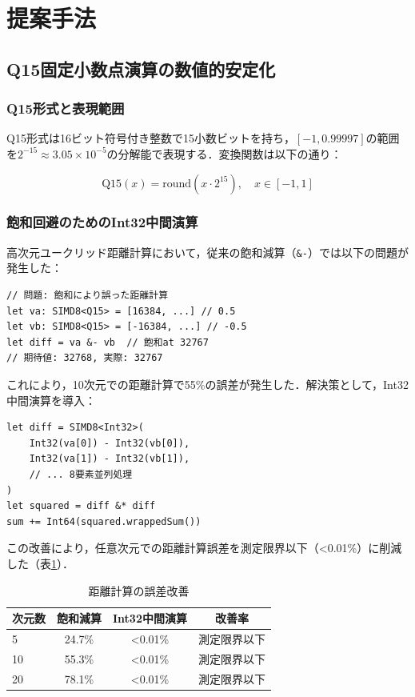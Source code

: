 \documentclass[paper]{ieice}
\begin{document}
\section{提案手法}

\subsection{Q15固定小数点演算の数値的安定化}

\subsubsection{Q15形式と表現範囲}
Q15形式は16ビット符号付き整数で15小数ビットを持ち，$[-1, 0.99997]$の範囲を$2^{-15} \approx 3.05 \times 10^{-5}$の分解能で表現する．変換関数は以下の通り：

\begin{equation}
\text{Q15}(x) = \text{round}(x \cdot 2^{15}), \quad x \in [-1, 1]
\end{equation}

\subsubsection{飽和回避のためのInt32中間演算}
高次元ユークリッド距離計算において，従来の飽和減算（\verb|&-|）では以下の問題が発生した：

\begin{lstlisting}[caption=飽和問題の発生例]
// 問題: 飽和により誤った距離計算
let va: SIMD8<Q15> = [16384, ...] // 0.5
let vb: SIMD8<Q15> = [-16384, ...] // -0.5
let diff = va &- vb  // 飽和at 32767
// 期待値: 32768, 実際: 32767
\end{lstlisting}

これにより，10次元での距離計算で55\%の誤差が発生した．解決策として，Int32中間演算を導入：

\begin{lstlisting}[caption=Int32中間演算による解決]
let diff = SIMD8<Int32>(
    Int32(va[0]) - Int32(vb[0]),
    Int32(va[1]) - Int32(vb[1]),
    // ... 8要素並列処理
)
let squared = diff &* diff
sum += Int64(squared.wrappedSum())
\end{lstlisting}

この改善により，任意次元での距離計算誤差を測定限界以下（<0.01\%）に削減した（表\ref{tab:distance_error}）．

\begin{table}[t]
\caption{距離計算の誤差改善}
\label{tab:distance_error}
\centering
\begin{tabular}{lccc}
\toprule
次元数 & 飽和減算 & Int32中間演算 & 改善率 \\
\midrule
5 & 24.7\% & <0.01\% & 測定限界以下 \\
10 & 55.3\% & <0.01\% & 測定限界以下 \\
20 & 78.1\% & <0.01\% & 測定限界以下 \\
\bottomrule
\end{tabular}
\end{table}
\end{document}
